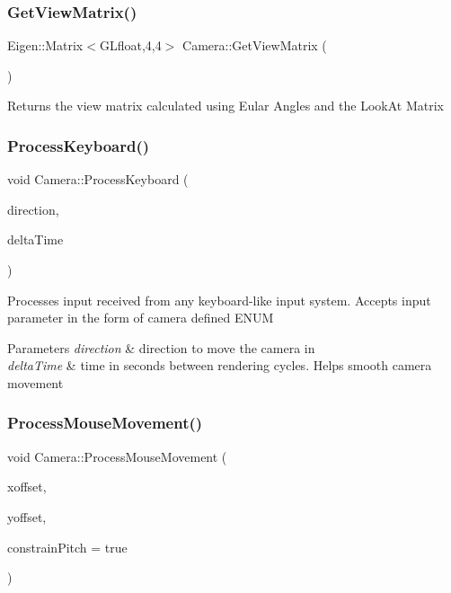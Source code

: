 \subsubsection{\texorpdfstring{Get\+View\+Matrix()}{GetViewMatrix()}}
{\footnotesize\ttfamily Eigen\+::\+Matrix$<$G\+Lfloat,4,4$>$ Camera\+::\+Get\+View\+Matrix (\begin{DoxyParamCaption}{ }\end{DoxyParamCaption})\hspace{0.3cm}{\ttfamily [inline]}}

\begin{DoxyReturn}{Returns}
the view matrix calculated using Eular Angles and the Look\+At Matrix 
\end{DoxyReturn}
\mbox{\label{classCamera_ac7e9a7f3e63c670fd695a8f03d02dbdf}} 
\subsubsection{\texorpdfstring{Process\+Keyboard()}{ProcessKeyboard()}}
{\footnotesize\ttfamily void Camera\+::\+Process\+Keyboard (\begin{DoxyParamCaption}\item[{Camera\+\_\+\+Movement}]{direction,  }\item[{G\+Lfloat}]{delta\+Time }\end{DoxyParamCaption})\hspace{0.3cm}{\ttfamily [inline]}}

Processes input received from any keyboard-\/like input system. Accepts input parameter in the form of camera defined E\+N\+UM 
\begin{DoxyParams}{Parameters}
{\em direction} & direction to move the camera in \\
\hline
{\em delta\+Time} & time in seconds between rendering cycles. Helps smooth camera movement \\
\hline
\end{DoxyParams}
\mbox{\label{classCamera_a97ffbf8d8935fc63bd2ca71a4268eec4}} 
\subsubsection{\texorpdfstring{Process\+Mouse\+Movement()}{ProcessMouseMovement()}}
{\footnotesize\ttfamily void Camera\+::\+Process\+Mouse\+Movement (\begin{DoxyParamCaption}\item[{G\+Lfloat}]{xoffset,  }\item[{G\+Lfloat}]{yoffset,  }\item[{G\+Lboolean}]{constrain\+Pitch = {\ttfamily true} }\end{DoxyParamCaption})\hspace{0.3cm}{\ttfamily [inline]}}

